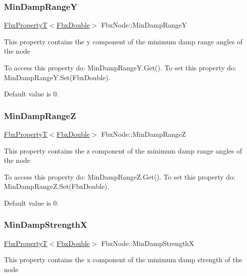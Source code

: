\subsubsection{\texorpdfstring{Min\+Damp\+RangeY}{MinDampRangeY}}
{\footnotesize\ttfamily \hyperlink{class_fbx_property_t}{Fbx\+PropertyT}$<$\hyperlink{fbxtypes_8h_a171e72a1c46fc15c1a6c9c31948c1c5b}{Fbx\+Double}$>$ Fbx\+Node\+::\+Min\+Damp\+RangeY}

This property contains the y component of the minimum damp range angles of the node

To access this property do\+: Min\+Damp\+Range\+Y.\+Get(). To set this property do\+: Min\+Damp\+Range\+Y.\+Set(\+Fbx\+Double).

Default value is 0. \mbox{\label{class_fbx_node_ae1e9a899c7fcc6e2e8445a4dbc127720}} 
\subsubsection{\texorpdfstring{Min\+Damp\+RangeZ}{MinDampRangeZ}}
{\footnotesize\ttfamily \hyperlink{class_fbx_property_t}{Fbx\+PropertyT}$<$\hyperlink{fbxtypes_8h_a171e72a1c46fc15c1a6c9c31948c1c5b}{Fbx\+Double}$>$ Fbx\+Node\+::\+Min\+Damp\+RangeZ}

This property contains the z component of the minimum damp range angles of the node

To access this property do\+: Min\+Damp\+Range\+Z.\+Get(). To set this property do\+: Min\+Damp\+Range\+Z.\+Set(\+Fbx\+Double).

Default value is 0. \mbox{\label{class_fbx_node_ad3a1c278541e69133e0b1f3c25b98dfe}} 
\subsubsection{\texorpdfstring{Min\+Damp\+StrengthX}{MinDampStrengthX}}
{\footnotesize\ttfamily \hyperlink{class_fbx_property_t}{Fbx\+PropertyT}$<$\hyperlink{fbxtypes_8h_a171e72a1c46fc15c1a6c9c31948c1c5b}{Fbx\+Double}$>$ Fbx\+Node\+::\+Min\+Damp\+StrengthX}

This property contains the x component of the minimum damp strength of the node

